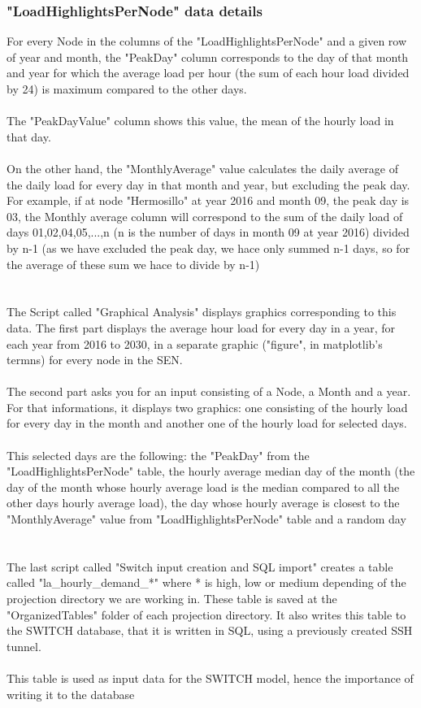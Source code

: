 \documentclass{article}
\begin{document}
\subsubsection{"LoadHighlightsPerNode" data details}
For every Node in the columns of the "LoadHighlightsPerNode" and a given row of year and month, the "PeakDay" column corresponds to the day of that month and year for which the average load per hour (the sum of each hour load divided by 24) is maximum compared to the other days. 
\\
\\The "PeakDayValue" column shows this value, the mean of the hourly load in that day. 
\\
\\On the other hand, the "MonthlyAverage" value calculates the daily average of the daily load for every day in that month and year, but excluding the peak day. For example, if at node "Hermosillo" at year 2016 and month 09, the peak day is 03, the Monthly average column will correspond to the sum of the daily load of days 01,02,04,05,...,n (n is the number of days in month 09 at year 2016) divided by n-1 (as we have excluded the peak day, we hace only summed n-1 days, so for the average of these sum we hace to divide by n-1)
\\
\\
\\
The Script called "Graphical Analysis" displays graphics corresponding to this data. The first part displays the average hour load for every day in a year, for each year from 2016 to 2030, in a separate graphic ("figure", in matplotlib's termns) for every node in the SEN.
\\
\\The second part asks you for an input consisting of a Node, a Month and a year. For that informations, it displays two graphics: one consisting of the hourly load for every day in the month and another one of the hourly load for selected days. 
\\
\\This selected days are the following: the "PeakDay" from the "LoadHighlightsPerNode" table, the hourly average median day of the month (the day of the month whose hourly average load is the median compared to all the other days hourly average load), the day whose hourly average is closest to the "MonthlyAverage" value from "LoadHighlightsPerNode" table and a random day
\\
\\
\\The last script called "Switch input creation and SQL import" creates a table called "la\_hourly\_demand\_*" where * is high, low or medium depending of the projection directory we are working in. These table is saved at the "OrganizedTables" folder of each projection directory. It also writes this table to the SWITCH database, that it is written in SQL, using a previously created SSH tunnel.
\\
\\ This table is used as input data for the SWITCH model, hence the importance of writing it to the database
\end{document}
